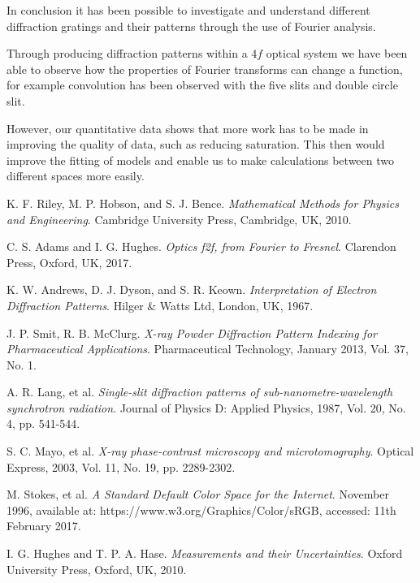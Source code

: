 \documentclass[twocolumn]{revtex4}
\begin{document}
In conclusion it has been possible to investigate and understand different diffraction gratings and their patterns through the use of Fourier analysis.

Through producing diffraction patterns within a $4f$ optical system we have been able to observe how the properties of Fourier transforms can change a function, for example convolution has been observed with the five slits and double circle slit.

However, our quantitative data shows that more work has to be made in improving the quality of data, such as reducing saturation. This then would improve the fitting of models and enable us to make calculations between two different spaces more easily.

\begin{thebibliography}{5}
	K. F. Riley, M. P. Hobson, and S. J. Bence.
	\textit{Mathematical Methods for Physics and Engineering}.
	Cambridge University Press, Cambridge, UK, 2010.
	
	C. S. Adams and I. G. Hughes.
	\textit{Optics f2f, from Fourier to Fresnel}.
	Clarendon Press, Oxford, UK, 2017.

	K. W. Andrews, D. J. Dyson, and S. R. Keown.
	\textit{Interpretation of Electron Diffraction Patterns}.
	Hilger \& Watts Ltd, London, UK, 1967.
	
	J. P. Smit, R. B. McClurg.	
	\textit{X-ray Powder Diffraction Pattern Indexing for Pharmaceutical Applications}.
	Pharmaceutical Technology, January 2013, Vol. 37, No. 1.
	
	A. R. Lang, et al.
	\textit{Single-slit diffraction patterns of sub-nanometre-wavelength synchrotron radiation}.
	Journal of Physics D: Applied Physics, 1987, Vol. 20, No. 4, pp. 541-544.
	
	S. C. Mayo, et al.
	\textit{X-ray phase-contrast microscopy and microtomography}.
	Optical Express, 2003, Vol. 11, No. 19, pp. 2289-2302.
	
	M. Stokes, et al.
	\textit{A Standard Default Color Space for the Internet}.
	November 1996, available at: https://www.w3.org/Graphics/Color/sRGB, accessed: 11th February 2017. 
	
	I. G. Hughes and T. P. A. Hase.
	\textit{Measurements and their Uncertainties}. 
	Oxford University Press, Oxford, UK, 2010.
	
\end{thebibliography}
\clearpage
\end{document}

